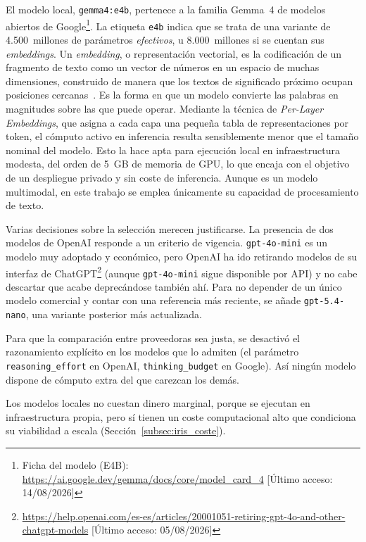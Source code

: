 El modelo local, \texttt{gemma4:e4b}, pertenece a la familia Gemma~4 de modelos
abiertos de Google\footnote{Ficha del modelo (E4B): \url{https://ai.google.dev/gemma/docs/core/model_card_4} [Último acceso: 14/08/2026]}.
La etiqueta \texttt{e4b} indica que se trata de una variante de 4.500~millones de
parámetros \emph{efectivos}, u 8.000~millones si se cuentan sus
\textit{embeddings}. Un \textit{embedding}, o representación vectorial, es la
codificación de un fragmento de texto como un vector de números en un espacio de
muchas dimensiones, construido de manera que los textos de significado próximo
ocupan posiciones cercanas~\cite{mikolov2013}. Es la forma en que un modelo
convierte las palabras en magnitudes sobre las que puede operar. Mediante la
técnica de \textit{Per-Layer Embeddings}, que asigna a cada capa una pequeña tabla
de representaciones por token, el cómputo activo en inferencia resulta
sensiblemente menor que el tamaño nominal del modelo. Esto la hace apta para ejecución local en
infraestructura modesta, del orden de 5~GB de memoria de GPU, lo que encaja con el
objetivo de un despliegue privado y sin coste de inferencia. Aunque es un modelo
multimodal, en este trabajo se emplea únicamente su capacidad de procesamiento de
texto.

Varias decisiones sobre la selección merecen justificarse. La presencia de dos modelos de OpenAI responde a un criterio de vigencia.
\texttt{gpt-4o-mini} es un modelo muy adoptado y económico, pero OpenAI ha ido
retirando modelos de su interfaz de ChatGPT\footnote{\url{https://help.openai.com/es-es/articles/20001051-retiring-gpt-4o-and-other-chatgpt-models} [Último acceso: 05/08/2026]}
(aunque \texttt{gpt-4o-mini} sigue disponible por API) y no cabe descartar que
acabe deprecándose también ahí. Para no depender de un único modelo comercial y
contar con una referencia más reciente, se añade \texttt{gpt-5.4-nano}, una
variante posterior más actualizada.

Para que la comparación entre proveedoras sea justa, se desactivó el razonamiento
explícito en los modelos que lo admiten (el parámetro \texttt{reasoning\_effort}
en OpenAI, \texttt{thinking\_budget} en Google). Así ningún modelo dispone de
cómputo extra del que carezcan los demás.

Los modelos locales no cuestan dinero marginal, porque se ejecutan en infraestructura propia,
pero sí tienen un coste computacional alto que condiciona su viabilidad a escala
(Sección~\ref{subsec:iris_coste}).
